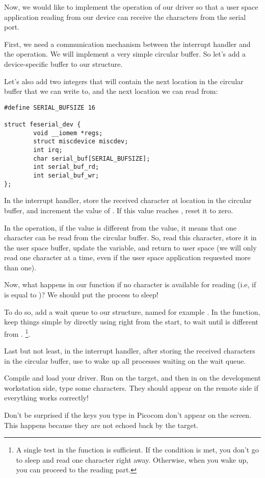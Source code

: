 Now, we would like to implement the  operation of our
driver so that a user space application reading from our device can
receive the characters from the serial port.

First, we need a communication mechanism between the interrupt handler
and the  operation. We will implement a very simple
circular buffer. So let's add a device-specific buffer to our 
 structure.

Let's also add two integers that will contain the next location
in the circular buffer that we can write to, and the next location
we can read from:

\begin{verbatim}
#define SERIAL_BUFSIZE 16

struct feserial_dev {
        void __iomem *regs;
        struct miscdevice miscdev;
        int irq;
        char serial_buf[SERIAL_BUFSIZE];
        int serial_buf_rd;
        int serial_buf_wr;
};
\end{verbatim}

In the interrupt handler, store the received character at location
 in the circular buffer, and increment the value
of . If this value reaches ,
reset it to zero.

In the  operation, if the  value is
different from the  value, it means that one
character can be read from the circular buffer. So, read this
character, store it in the user space buffer, update the
 variable, and return to user space (we will only
read one character at a time, even if the user space application
requested more than one).

Now, what happens in our  function if no character is
available for reading (i.e, if  is equal to
)? We should put the process to sleep!

To do so, add a wait queue to our  structure,
named for example . In the  function,
keep things simple by directly using 
right from the start, to wait until 
is different from . \footnote{A single test in the 
 function is sufficient. If the
condition is met, you don't go to sleep and read one character right away.
Otherwise, when you wake up, you can proceed to the reading part.}.

Last but not least, in the interrupt handler,
after storing the received characters in the circular buffer, use
 to wake up all processes waiting on the wait queue.

Compile and load your driver. Run 
on the target, and then in  on the development
workstation side, type some characters. They should appear on the
remote side if everything works correctly!

Don't be surprised if the keys you type in Picocom don't appear on the
screen. This happens because they are not echoed back by the target.
